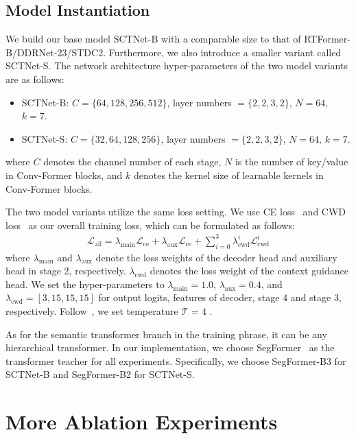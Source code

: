 \documentclass[letterpaper]{article} %
\begin{document}
\subsection{Model Instantiation}
We build our base model SCTNet-B with a comparable size to that of RTFormer-B/DDRNet-23/STDC2. Furthermore, we also introduce a smaller variant called SCTNet-S. The network architecture hyper-parameters of the two model variants are as follows:
\begin{itemize}
    \item SCTNet-B: $C=\{64,128,256,512\}$, layer numbers $=\{2,2,3,2\}$, $N = 64$, $k=7$.
    \item SCTNet-S: $C=\{32,64,128,256\}$, layer numbers $=\{2,2,3,2\}$, $N = 64$, $k=7$.
\end{itemize}
where $C$ denotes the channel number of each stage, $N$ is the number of key/value in Conv-Former blocks, and $k$ denotes the kernel size of learnable kernels in Conv-Former blocks.

 The two model variants utilize the same loss setting. We use CE loss~\cite{milletari2016v} and CWD loss~\cite{shu2021channel} as our overall training loss, which can be formulated as follows: 
\begin{equation}\label{Eq:TrainingLoss}
\begin{aligned}
\mathcal{L}_{\text{all}} = \lambda_{\text{main}}\mathcal{L}_{\text{ce}} + \lambda_{\text{aux}}\mathcal{L}_{\text{ce}} + \sum_{i=0}^{3}\lambda_{\text{cwd}}^{i}\mathcal{L}_{\text{cwd}}^{i}  
\end{aligned}
\end{equation}
where $\lambda_{\text{main}}$ and $\lambda_{\text{aux}}$ denote the loss weights of the decoder head and auxiliary head in stage 2, respectively. $\lambda_{\text{cwd}}$ denotes the loss weight of the context guidance head. We set the hyper-parameters to $\lambda_{\text{main}} = 1.0$, $\lambda_{\text{aux}} = 0.4$, and $\lambda_{\text{cwd}} = [3,15,15,15]$ for output logits, features of decoder, stage 4 and stage 3, respectively. Follow~\cite{shu2021channel}, we set temperature $\mathcal{T} = 4$ .

As for the semantic transformer branch in the training phrase, it can be any hierarchical transformer. In our implementation, we choose SegFormer~\cite{xie2021segformer} as the transformer teacher for all experiments. Specifically, we choose SegFormer-B3 for SCTNet-B and SegFormer-B2 for SCTNet-S. 




\section{More Ablation Experiments}\label{section:B}
\end{document}
